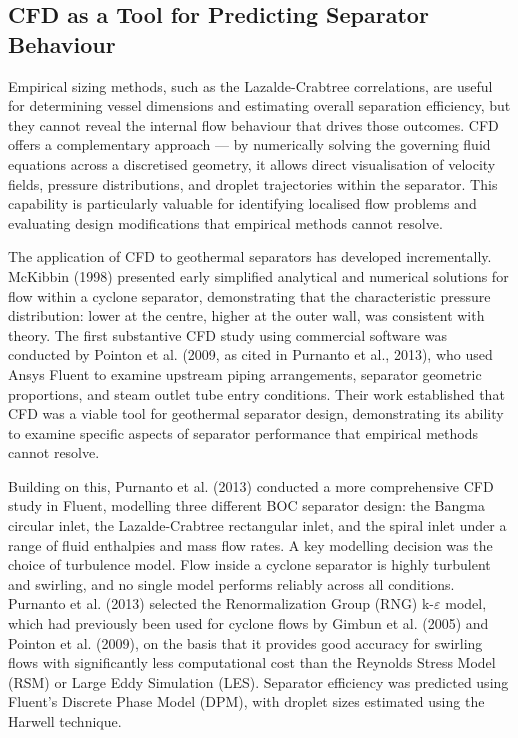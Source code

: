 \subsection{CFD as a Tool for Predicting Separator Behaviour}

Empirical sizing methods, such as the Lazalde-Crabtree correlations, are useful for determining vessel dimensions and estimating overall separation efficiency, but they cannot reveal the internal flow behaviour that drives those outcomes. CFD offers a complementary approach — by numerically solving the governing fluid equations across a discretised geometry, it allows direct visualisation of velocity fields, pressure distributions, and droplet trajectories within the separator. This capability is particularly valuable for identifying localised flow problems and evaluating design modifications that empirical methods cannot resolve.

The application of CFD to geothermal separators has developed incrementally. McKibbin (1998) presented early simplified analytical and numerical solutions for flow within a cyclone separator, demonstrating that the characteristic pressure distribution: lower at the centre, higher at the outer wall, was consistent with theory. The first substantive CFD study using commercial software was conducted by Pointon et al. (2009, as cited in Purnanto et al., 2013), who used Ansys Fluent to examine upstream piping arrangements, separator geometric proportions, and steam outlet tube entry conditions. Their work established that CFD was a viable tool for geothermal separator design, demonstrating its ability to examine specific aspects of separator performance that empirical methods cannot resolve.

Building on this, Purnanto et al. (2013) conducted a more comprehensive CFD study in Fluent, modelling three different BOC separator design: the Bangma circular inlet, the Lazalde-Crabtree rectangular inlet, and the spiral inlet under a range of fluid enthalpies and mass flow rates. A key modelling decision was the choice of turbulence model. Flow inside a cyclone separator is highly turbulent and swirling, and no single model performs reliably across all conditions. Purnanto et al. (2013) selected the Renormalization Group (RNG) k-\ensuremath{\varepsilon} model, which had previously been used for cyclone flows by Gimbun et al. (2005) and Pointon et al. (2009), on the basis that it provides good accuracy for swirling flows with significantly less computational cost than the Reynolds Stress Model (RSM) or Large Eddy Simulation (LES). Separator efficiency was predicted using Fluent's Discrete Phase Model (DPM), with droplet sizes estimated using the Harwell technique.

